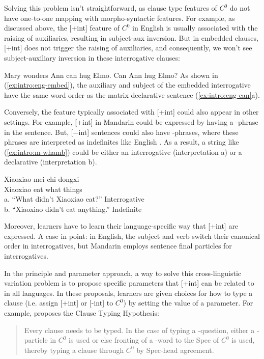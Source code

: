 Solving this problem isn't straightforward, as clause type features of $C^{0}$ do not have one-to-one mapping with morpho-syntactic features. For example, as discussed above, the [+int] feature of $C^{0}$ in English is usually associated with the raising of auxiliaries, resulting in subject-aux inversion. But in embedded clauses, [+int] does not trigger the raising of auxiliaries, and consequently, we won't see subject-auxiliary inversion in these interrogative clauses: 

Mary wonders 
\eex
{}
\bxl
Ann can hug Elmo.
\ex Can Ann hug Elmo?
\exl
\eex
As shown in (\ref{ex:intro:eng-embed}), the auxiliary  and subject  of the embedded interrogative have the same word order as the matrix declarative sentence (\ref{ex:intro:eng-can}a).


Conversely, the feature typically associated with [+int] could also appear in other settings. For example, [+int] in Mandarin could be expressed by having a \twh-phrase in the sentence. But, [$-$int] sentences could also have \twh-phrases, where these phrases are interpreted as indefinites like English . As a result, a string like (\ref{ex:intro:m-whamb}) could be either an interrogative (interpretation a) or a declarative (interpretation b). 


\gll Xiaoxiao mei 	chi 	 dongxi\\ 
Xiaoxiao \Neg{} 	eat	what	things\\
a.	``What didn’t Xiaoxiao eat?''	\hfill Interrogative \twh\\
b.	``Xiaoxiao didn’t eat anything.''		\hfill Indefinite \twh
\eex

Moreover, learners have to learn their language-specific way that [+int] are expressed. A case in point: in English, the subject and verb switch their canonical order in interrogatives, but Mandarin employs sentence final particles for interrogatives. 

In the principle and parameter approach, a way to solve this cross-linguistic variation problem is to propose specific parameters that [+int] can be related to in all languages. In these proposals, learners are given choices for how to type a clause (i.e. assign [+int] or [-int] to $C^{0}$) by setting the value of a parameter. For example, \textcite{cheng1991} proposes the Clause Typing Hypothesis:

\begin{quote}
Every clause needs to be typed. In the case of typing a \twh-question, either a \twh-particle in $C^{0}$ is used or else fronting of a \twh-word to the Spec of $C^{0}$ is used, thereby typing a clause through $C^{0}$ by Spec-head agreement. \hfill \textcite[p.29]{cheng1991}

\end{quote}


